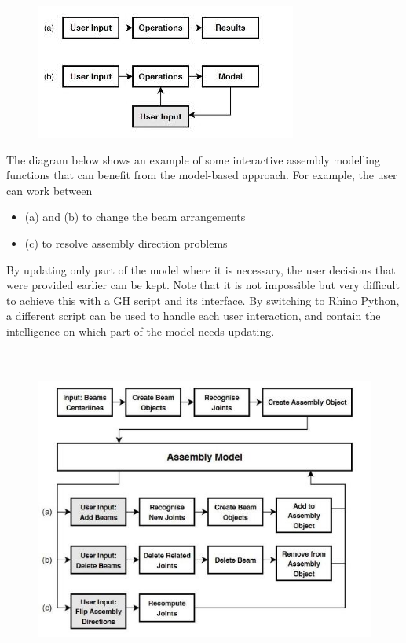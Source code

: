 \documentclass[11pt]{book}
\begin{document}
\begin{figure}[H]
\includegraphics[width=8.59cm,height=4.42cm]{./images/image12.jpeg}
\end{figure}


The diagram below shows an example of some interactive assembly modelling functions that can benefit from the model-based approach. For example, the user can work between

\begin{itemize}
	\item (a) and (b) to change the beam arrangements

	\item (c) to resolve assembly direction problems

\end{itemize}
By updating only part of the model where it is necessary, the user decisions that were provided earlier can be kept. Note that it is not impossible but very difficult to achieve this with a GH script and its interface. By switching to Rhino Python, a different script can be used to handle each user interaction, and contain the intelligence on which part of the model needs updating.

\begin{figure}[H]
\includegraphics[width=13.98cm,height=10.71cm]{./images/image13.jpeg}
\end{figure}
\end{document}
